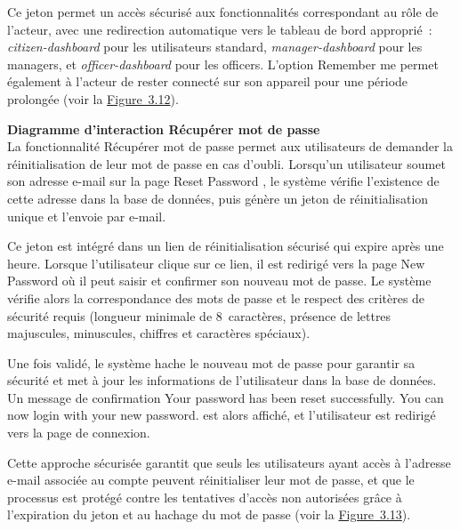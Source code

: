 \hspace{1em}Ce jeton permet un accès sécurisé aux fonctionnalités correspondant au rôle de l'acteur, avec une redirection automatique vers le tableau de bord approprié~: \textit{citizen-dashboard} pour les utilisateurs standard, \textit{manager-dashboard} pour les managers, et \textit{officer-dashboard} pour les officers. L'option \og Remember me \fg{} permet également à l'acteur de rester connecté sur son appareil pour une période prolongée (voir la \hyperref[fig:3.12]{Figure~3.12}).

\medskip

\noindent\textbf{\textendash{} Diagramme d'interaction \og Récupérer mot de passe \fg{}}\\
\hspace{1em}La fonctionnalité \og Récupérer mot de passe \fg{} permet aux utilisateurs de demander la réinitialisation de leur mot de passe en cas d'oubli. Lorsqu'un utilisateur soumet son adresse e-mail sur la page \og Reset Password \fg{}, le système vérifie l'existence de cette adresse dans la base de données, puis génère un jeton de réinitialisation unique et l'envoie par e-mail.

\hspace{1em}Ce jeton est intégré dans un lien de réinitialisation sécurisé qui expire après une heure. Lorsque l'utilisateur clique sur ce lien, il est redirigé vers la page \og New Password \fg{} où il peut saisir et confirmer son nouveau mot de passe. Le système vérifie alors la correspondance des mots de passe et le respect des critères de sécurité requis (longueur minimale de 8~caractères, présence de lettres majuscules, minuscules, chiffres et caractères spéciaux).

\hspace{1em}Une fois validé, le système hache le nouveau mot de passe pour garantir sa sécurité et met à jour les informations de l'utilisateur dans la base de données. Un message de confirmation \og Your password has been reset successfully. You can now login with your new password. \fg{} est alors affiché, et l'utilisateur est redirigé vers la page de connexion.

\hspace{1em}Cette approche sécurisée garantit que seuls les utilisateurs ayant accès à l'adresse e-mail associée au compte peuvent réinitialiser leur mot de passe, et que le processus est protégé contre les tentatives d'accès non autorisées grâce à l'expiration du jeton et au hachage du mot de passe (voir la \hyperref[fig:3.13]{Figure~3.13}).

